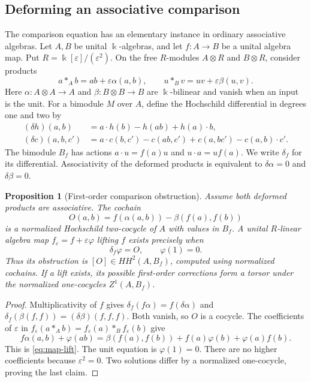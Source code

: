 \documentclass[11pt]{article}
\newtheorem{proposition}[theorem]{Proposition}
\theoremstyle{definition}
\theoremstyle{remark}
\begin{document}
\subsection{Deforming an associative comparison}\label{sec:map-deformation}

The comparison equation has an elementary instance in ordinary associative
algebras.  Let $A,B$ be unital $\Bbbk$-algebras, and let $f:A\to B$
be a unital algebra map.  Put $R=\Bbbk[\varepsilon]/(\varepsilon^2)$.
On the free $R$-modules $A\otimes R$ and $B\otimes R$, consider products
\[
 a*_A b=ab+\varepsilon\alpha(a,b),\qquad
 u*_B v=uv+\varepsilon\beta(u,v).
\]
Here $\alpha:A\otimes A\to A$ and $\beta:B\otimes B\to B$ are
$\Bbbk$-bilinear and vanish when an input is the unit.  For a bimodule
$M$ over $A$, define the Hochschild differential in degrees one and two by
\begin{align*}
 (\delta h)(a,b)&=a\cdot h(b)-h(ab)+h(a)\cdot b,\\
 (\delta c)(a,b,c')&=a\cdot c(b,c')-c(ab,c')
                     +c(a,bc')-c(a,b)\cdot c'.
\end{align*}
The bimodule $B_f$ has actions $a\cdot u=f(a)u$ and $u\cdot a=uf(a)$.
We write $\delta_f$ for its differential.  Associativity of the deformed
products is equivalent to $\delta\alpha=0$ and $\delta\beta=0$.

\begin{proposition}[First-order comparison obstruction]
\label{prop:map-deformation}
Assume both deformed products are associative.  The cochain
\[
 O(a,b)=f(\alpha(a,b))-\beta(f(a),f(b))
\]
is a normalized Hochschild two-cocycle of $A$ with values in $B_f$.
A unital $R$-linear algebra map $f_\varepsilon=f+\varepsilon\varphi$
lifting $f$ exists precisely when
\[
 \delta_f\varphi=O,\qquad \varphi(1)=0.
 \label{eq:map-lift}\tag{5.17}
\]
Thus its obstruction is $[O]\in HH^2(A,B_f)$, computed using normalized
cochains.  If a lift exists, its possible first-order corrections form
a torsor under the normalized one-cocycles $Z^1(A,B_f)$.
\end{proposition}

\begin{proof}
Multiplicativity of $f$ gives
$\delta_f(f\alpha)=f(\delta\alpha)$ and
$\delta_f(\beta(f,f))=(\delta\beta)(f,f,f)$.
Both vanish, so $O$ is a cocycle.  The coefficients of $\varepsilon$ in
$f_\varepsilon(a*_A b)=f_\varepsilon(a)*_B f_\varepsilon(b)$ give
\[
 f\alpha(a,b)+\varphi(ab)
 =\beta(f(a),f(b))+f(a)\varphi(b)+\varphi(a)f(b).
\]
This is \eqref{eq:map-lift}.  The unit equation is $\varphi(1)=0$.
There are no higher coefficients because $\varepsilon^2=0$.
Two solutions differ by a normalized one-cocycle, proving the last claim.
\end{proof}
\end{document}
